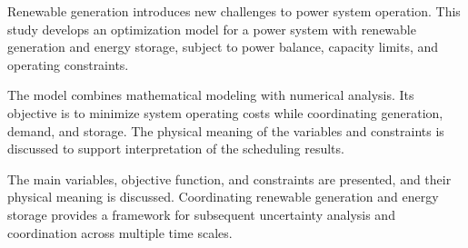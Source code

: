 \begin{abstract}
新能源发电的波动性给电力系统运行带来新的挑战。本文以含新能源和储能的电力系统为研究对象，建立考虑功率平衡、设备容量与运行成本的优化模型，分析新能源出力变化对系统调度的影响。

研究采用数学建模与数值分析相结合的方法，通过统一描述发电、负荷和储能设备的运行约束，构建具有可解释性的优化框架。模型以系统运行成本最小为目标，并对储能充放电行为进行约束，以保证调度方案满足设备运行条件。

本文给出模型的主要变量、目标函数和约束关系，并讨论求解结果的物理意义。研究表明，通过协调新能源发电与储能资源，可以改善电力系统的运行方式。所建立的框架为后续开展不确定性分析和多时间尺度协调提供基础。

\end{abstract}
\begin{abstractEn}
Renewable generation introduces new challenges to power system operation. This study develops an optimization model for a power system with renewable generation and energy storage, subject to power balance, capacity limits, and operating constraints.

The model combines mathematical modeling with numerical analysis. Its objective is to minimize system operating costs while coordinating generation, demand, and storage. The physical meaning of the variables and constraints is discussed to support interpretation of the scheduling results.

The main variables, objective function, and constraints are presented, and their physical meaning is discussed. Coordinating renewable generation and energy storage provides a framework for subsequent uncertainty analysis and coordination across multiple time scales.
\end{abstractEn}
